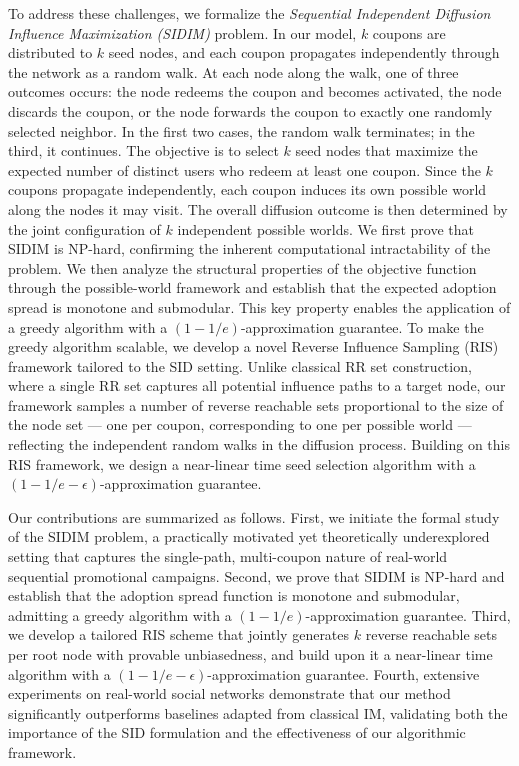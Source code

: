 \documentclass[sigconf]{acmart}
\begin{document}
To address these challenges, we formalize the \emph{Sequential Independent Diffusion Influence Maximization (SIDIM)} problem. In our model, $k$ coupons are distributed to $k$ seed nodes, and each coupon propagates independently through the network as a random walk. At each node along the walk, one of three outcomes occurs: the node redeems the coupon and becomes activated, the node discards the coupon, or the node forwards the coupon to exactly one randomly selected neighbor. In the first two cases, the random walk terminates; in the third, it continues. The objective is to select $k$ seed nodes that maximize the expected number of distinct users who redeem at least one coupon. Since the $k$ coupons propagate independently, each coupon induces its own possible world along the nodes it may visit. The overall diffusion outcome is then determined by the joint configuration of $k$ independent possible worlds. We first prove that SIDIM is NP-hard, confirming the inherent computational intractability of the problem. We then analyze the structural properties of the objective function through the possible-world framework and establish that the expected adoption spread is monotone and submodular. This key property enables the application of a greedy algorithm with a $(1-1/e)$-approximation guarantee. To make the greedy algorithm scalable, we develop a novel Reverse Influence Sampling (RIS) framework tailored to the SID setting. Unlike classical RR set construction, where a single RR set captures all potential influence paths to a target node, our framework samples a number of reverse reachable sets proportional to the size of the node set --- one per coupon, corresponding to one per possible world --- reflecting the independent random walks in the diffusion process. Building on this RIS framework, we design a near-linear time seed selection algorithm with a $(1-1/e-\epsilon)$-approximation guarantee.

Our contributions are summarized as follows. First, we initiate the formal study of the SIDIM problem, a practically motivated yet theoretically underexplored setting that captures the single-path, multi-coupon nature of real-world sequential promotional campaigns. Second, we prove that SIDIM is NP-hard and establish that the adoption spread function is monotone and submodular, admitting a greedy algorithm with a $(1-1/e)$-approximation guarantee. Third, we develop a tailored RIS scheme that jointly generates $k$ reverse reachable sets per root node with provable unbiasedness, and build upon it a near-linear time algorithm with a $(1-1/e-\epsilon)$-approximation guarantee. Fourth, extensive experiments on real-world social networks demonstrate that our method significantly outperforms baselines adapted from classical IM, validating both the importance of the SID formulation and the effectiveness of our algorithmic framework.
\end{document}

